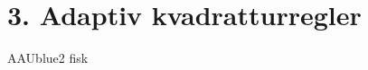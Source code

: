 \section*{3. Adaptiv kvadratturregler}
%
% 
%
\begin{color}{AAUblue2}
%
fisk
% 
\end{color}
\\\\
% 
%
